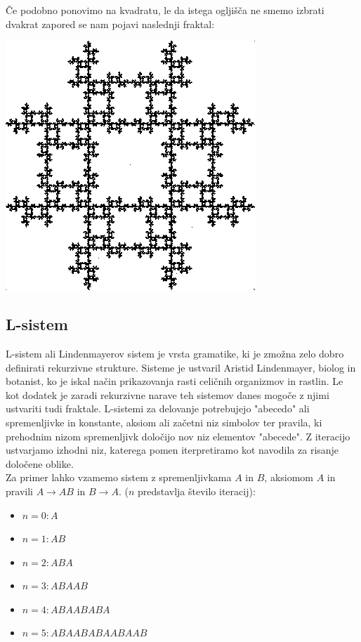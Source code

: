 \documentclass[a4paper, 12px]{article}
\begin{document}
        Če podobno ponovimo na kvadratu, le da istega ogljišča ne smemo izbrati dvakrat zapored se nam pojavi naslednji fraktal:
        \centerline{\includegraphics[scale=0.6]{square-fractal.PNG}}
        \begingroup
        \endgroup
    
    \subsection{L-sistem}
        L-sistem ali Lindenmayerov sistem je vrsta gramatike, ki je zmožna zelo dobro definirati rekurzivne strukture.
        Sisteme je ustvaril Aristid Lindenmayer, biolog in botanist, ko je iskal način prikazovanja rasti celičnih organizmov in rastlin.
        Le kot dodatek je zaradi rekurzivne narave teh sistemov danes mogoče z njimi ustvariti tudi fraktale.
        L-sistemi za delovanje potrebujejo "abecedo" ali spremenljivke in konstante, aksiom ali začetni niz simbolov ter pravila, ki prehodnim nizom spremenljivk določijo nov niz elementov "abecede".
        Z iteracijo ustvarjamo izhodni niz, katerega pomen iterpretiramo kot navodila za risanje določene oblike.
        \cite{LSystem}\\

        Za primer lahko vzamemo sistem z spremenljivkama $A$ in $B$, aksiomom $A$ in pravili $A \rightarrow AB$ in $B \rightarrow A$. ($n$ predstavlja število iteracij):
        \begin{itemize}
            \item[] $n=0: A$
            \item[] $n=1: AB$
            \item[] $n=2: ABA$
            \item[] $n=3: ABAAB$
            \item[] $n=4: ABAABABA$
            \item[] $n=5: ABAABABAABAAB$
        \end{itemize}
\end{document}
